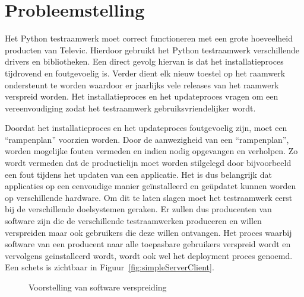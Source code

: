 \section{Probleemstelling}\label{sec:probleem}
Het Python testraamwerk moet correct functioneren met een grote hoeveelheid producten van Televic.
Hierdoor gebruikt het Python testraamwerk verschillende drivers en bibliotheken.
Een direct gevolg hiervan is dat het installatieproces tijdrovend en foutgevoelig is.
Verder dient elk nieuw toestel op het raamwerk ondersteunt te worden waardoor er jaarlijks vele releases van het raamwerk verspreid worden.
Het installatieproces en het updateproces vragen om een vereenvoudiging zodat het testraamwerk gebruiksvriendelijker wordt.

Doordat het installatieproces en het updateproces foutgevoelig zijn, moet een ``rampenplan'' voorzien worden.
Door de aanwezigheid van een ``rampenplan'', worden mogelijke fouten vermeden en indien nodig opgevangen en verholpen.
Zo wordt vermeden dat de productielijn moet worden stilgelegd door bijvoorbeeld een fout tijdens het updaten van een applicatie.
Het is dus belangrijk dat applicaties op een eenvoudige manier geïnstalleerd en geüpdatet kunnen worden op verschillende hardware.
Om dit te laten slagen moet het testraamwerk eerst bij de verschillende doelsystemen geraken.
Er zullen dus producenten van software zijn die de verschillende testraamwerken produceren en willen verspreiden maar ook gebruikers die deze willen ontvangen.
Het proces waarbij software van een producent naar alle toepasbare gebruikers verspreid wordt en vervolgens geïnstalleerd wordt, wordt ook wel het deployment proces genoemd.
Een schets is zichtbaar in Figuur~\vref{fig:simpleServerClient}.

\begin{figure}[!ht]
\centering
{}
\caption{Voorstelling van software verspreiding}
\label{fig:simpleServerClient}
\end{figure}

